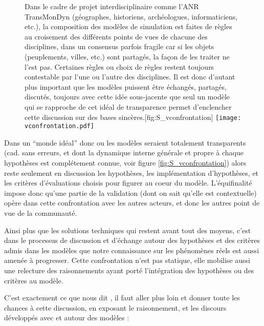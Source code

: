 \begin{figure}[htbp]
\begin{sidecaption}[fortoc]{Dans le cadre de projet interdisciplinaire comme l'ANR TransMonDyn (géographes, historiens, archéologues, informaticiens, etc.), la composition des modèles de simulation est faites de règles au croisement des différents points de vues de chacune des disciplines, dans un consensus parfois fragile car si les objets (peuplements, villes, etc.) sont partagés, la façon de les traiter ne l'est pas. Certaines règles ou choix de règles restent toujours contestable par l’une ou l’autre des disciplines. Il est donc d’autant plus important que les modèles puissent être échangés, partagés, discutés, toujours avec cette idée sous-jacente que seul un modèle qui se rapproche de cet idéal de transparence permet d’enclencher cette discussion sur des bases sincères.}[fig:S_vconfrontation]
  \centering
 \texttt{[image: vconfrontation.pdf]}
  \end{sidecaption}
\end{figure}

Dans un \enquote{monde idéal} donc ou les modèles seraient totalement transparents (cad. sans erreurs, et dont la dynamique interne générale et propre à chaque hypothèses est complétement connue, voir figure \ref{fig:S_vconfrontation}) alors reste seulement en discussion les hypothèses, les implémentation d'hypothèses, et les critères d’évaluations choisis pour figurer au coeur du modèle. L’équifinalité impose donc qu’une partie de la validation (dont on sait qu’elle est contextuelle) opère dans cette confrontation avec les autres acteurs, et donc les autres point de vue de la communauté. 

Ainsi plus que les solutions techniques qui restent avant tout des moyens, c'est dans le processus de discussion et d'échange autour des hypothèses et des critères admis dans les modèles que notre connaissance sur les phénomènes réels est aussi amenée à progresser. Cette confrontation n'est pas statique, elle mobilise aussi une relecture des raisonnements ayant porté l'intégration des hypothèses ou des critères au modèle. %

C'est exactement ce que nous dit \textcites{OSullivan2004,Millington2012}, il faut aller plus loin et donner toute les chances à cette discussion, en exposant le raisonnement, et les discours développés avec et autour des modèles : 

